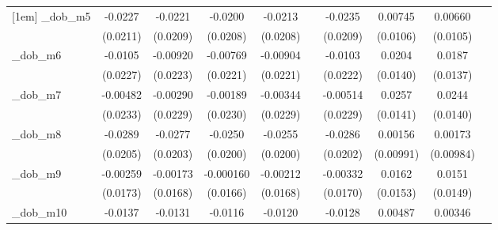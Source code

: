 \begin{table}[htbp]
\begin{tabular}{l*{9}{c}}
[1em]
\_dob\_m5     &     -0.0227         &     -0.0221         &     -0.0200         &     -0.0213         &                     &     -0.0235         &     0.00745         &     0.00660         &                     \\
            &    (0.0211)         &    (0.0209)         &    (0.0208)         &    (0.0208)         &                     &    (0.0209)         &    (0.0106)         &    (0.0105)         &                     \\
[1em]
\_dob\_m6     &     -0.0105         &    -0.00920         &    -0.00769         &    -0.00904         &                     &     -0.0103         &      0.0204         &      0.0187         &                     \\
            &    (0.0227)         &    (0.0223)         &    (0.0221)         &    (0.0221)         &                     &    (0.0222)         &    (0.0140)         &    (0.0137)         &                     \\
[1em]
\_dob\_m7     &    -0.00482         &    -0.00290         &    -0.00189         &    -0.00344         &                     &    -0.00514         &      0.0257\sym{*}  &      0.0244\sym{*}  &                     \\
            &    (0.0233)         &    (0.0229)         &    (0.0230)         &    (0.0229)         &                     &    (0.0229)         &    (0.0141)         &    (0.0140)         &                     \\
[1em]
\_dob\_m8     &     -0.0289         &     -0.0277         &     -0.0250         &     -0.0255         &                     &     -0.0286         &     0.00156         &     0.00173         &                     \\
            &    (0.0205)         &    (0.0203)         &    (0.0200)         &    (0.0200)         &                     &    (0.0202)         &   (0.00991)         &   (0.00984)         &                     \\
[1em]
\_dob\_m9     &    -0.00259         &    -0.00173         &   -0.000160         &    -0.00212         &                     &    -0.00332         &      0.0162         &      0.0151         &                     \\
            &    (0.0173)         &    (0.0168)         &    (0.0166)         &    (0.0168)         &                     &    (0.0170)         &    (0.0153)         &    (0.0149)         &                     \\
[1em]
\_dob\_m10    &     -0.0137         &     -0.0131         &     -0.0116         &     -0.0120         &                     &     -0.0128         &     0.00487         &     0.00346         &                     \\

\end{tabular}
\end{table}
